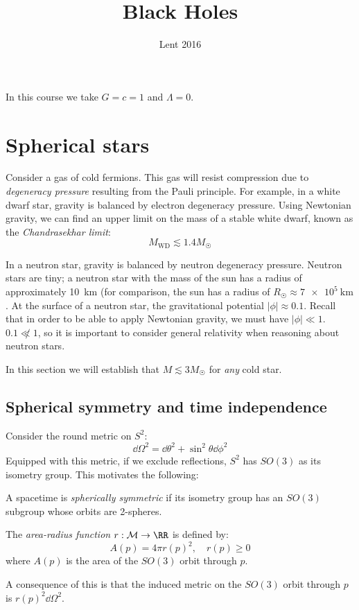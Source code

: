 \documentclass{jknotes}
\begin{document}
\title{Black Holes}
\date{Lent 2016}

\maketitle
\suggestionsspiel
In this course we take \(G=c=1\) and \(\Lambda=0\).
\tableofcontents

\section{Spherical stars}
Consider a gas of cold fermions. This gas will resist compression due to \emph{degeneracy pressure} resulting from the Pauli principle. For example, in a white dwarf star, gravity is balanced by electron degeneracy pressure. Using Newtonian gravity, we can find an upper limit on the mass of a stable white dwarf, known as the \emph{Chandrasekhar limit}:
\begin{equation}
    M_{\text{WD}} \lesssim 1.4M_{\astrosun}
\end{equation}

In a neutron star, gravity is balanced by neutron degeneracy pressure. Neutron stars are tiny; a neutron star with the mass of the sun has a radius of approximately \SI{10}{\kilo\meter} (for comparison, the sun has a radius of \(R_{\astrosun}\approx\SI{7e5}{\kilo\meter}\). At the surface of a neutron star, the gravitational potential \(|\phi|\approx0.1\). Recall that in order to be able to apply Newtonian gravity, we must have \(|\phi|\ll1\). \(0.1
\not\ll1\), so it is important to consider general relativity when reasoning about neutron stars.

In this section we will establish that \(M \lesssim 3M_{\astrosun}\) for \emph{any} cold star.

\subsection{Spherical symmetry and time independence}

Consider the round metric on \(S^2\):
\begin{equation}
    \dd{\Omega}^2 = \dd{\theta}^2+\sin^2\theta\dd{\phi}^2
\end{equation}
Equipped with this metric, if we exclude reflections, \(S^2\) has \(SO(3)\) as its isometry group. This motivates the following:
\begin{defn}
    A spacetime is \emph{spherically symmetric} if its isometry group has an \(SO(3)\) subgroup whose orbits are 2-spheres.
\end{defn}
\begin{defn}
    The \emph{area-radius function} \(r:\mathcal{M}\rightarrow\RR\) is defined by:
    \begin{equation}
        A(p) = 4\pi r(p)^2,\quad r(p)\ge 0
    \end{equation}
where \(A(p)\) is the area of the \(SO(3)\) orbit through \(p\).
\end{defn}
A consequence of this is that the induced metric on the \(SO(3)\) orbit through \(p\) is \(r(p)^2\dd{\Omega}^2\).
\end{document}
